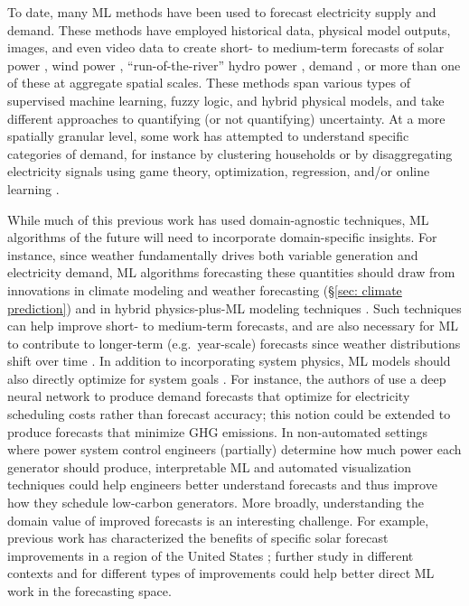 \documentclass[11pt]{report}
\begin{document}
To date, many ML methods have been used to forecast electricity supply and demand. These methods have employed historical data, physical model outputs, images, and even video data to create short- to medium-term forecasts of solar power \cite{mathe2019pvnet, das2018forecasting, voyant2017machine, wan2015photovoltaic, sun2018solar, nationalgrid2018powerswarm, alzahrani2017solar, li2016machine, sharma2011predicting}, wind power \cite{foley2012current, deepmind2019machine, wan2014probabilistic, liu2014short, pinson2003wind}, ``run-of-the-river'' hydro power \cite{perera2014machine}, demand \cite{hong2016probabilistic, soliman2010electrical, alfares2002electric, hippert2001neural}, or more than one of these \cite{juban2016multiple, wytock2013sparse} at aggregate spatial scales. These methods span various types of supervised machine learning, fuzzy logic, and hybrid physical models, and take different approaches to quantifying (or not quantifying) uncertainty. At a more spatially granular level, some work has attempted to understand specific categories of demand, for instance by clustering households \cite{kell2018segmenting, beckel2013automatic} or by disaggregating electricity signals using game theory, optimization, regression, and/or online learning \cite{anderson2018disaggregation, kara2018disaggregating, ledva2018real}. 

While much of this previous work has used domain-agnostic techniques, ML algorithms of the future will need to incorporate domain-specific insights. For instance, since weather fundamentally drives both variable generation and electricity demand, ML algorithms forecasting these quantities should draw from innovations in climate modeling and weather forecasting (\S\ref{sec: climate prediction}) and in hybrid physics-plus-ML modeling techniques \cite{wan2015photovoltaic, das2018forecasting, voyant2017machine}. Such techniques can help improve short- to medium-term forecasts, and are also necessary for ML to contribute to longer-term (e.g.~year-scale) forecasts since weather distributions shift over time \cite{kaack2017empirical}. In addition to incorporating system physics, ML models should also directly optimize for system goals \cite{donti2017task, elmachtoub2017smart, wilder2018melding}. For instance, the authors of \cite{donti2017task} use a deep neural network to produce demand forecasts that optimize for electricity scheduling costs rather than forecast accuracy; this notion could be extended to produce forecasts that minimize GHG emissions. In non-automated settings where power system control engineers (partially) determine how much power each generator should produce, interpretable ML and automated visualization techniques could help engineers better understand forecasts and thus improve how they schedule low-carbon generators. More broadly, understanding the domain value of improved forecasts is an interesting challenge. For example, previous work has characterized the benefits of specific solar forecast improvements in a region of the 
United States \cite{martinez2016value}; further study in different contexts and for different types of improvements could help better direct ML work in the forecasting space.
\end{document}
